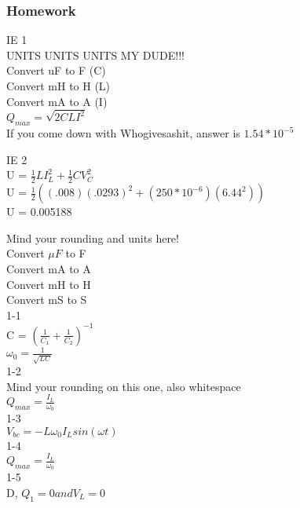 \documentclass{article}
\begin{document}
\subsubsection{Homework}
\noindent
IE 1 \\
UNITS UNITS UNITS MY DUDE!!! \\
Convert uF to F (C)\\
Convert mH to H (L)\\
Convert mA to A (I)\\
$Q_{max} = \sqrt{2 C L I^2}$ \\
If you come down with Whogivesashit, answer is $1.54 * 10^{-5}$

\vspace{2mm}

\noindent
IE 2 \\
U = $\frac{1}{2}LI^2_L + \frac{1}{2}CV^2_C$ \\
U = $\frac{1}{2}((.008)(.0293)^2+(250*10^{-6})(6.44^2))$ \\
U = 0.005188


\vspace{2mm}

\noindent
Mind your rounding and units here! \\
Convert $\mu F$ to F \\
Convert mA to A \\
Convert mH to H \\
Convert mS to S \\
1-1 \\
C = $(\frac{1}{C_1} + \frac{1}{C_2})^{-1}$ \\
$\omega_0 = \frac{1}{\sqrt{LC}}$ \\
1-2 \\
Mind your rounding on this one, also whitespace \\
$Q_{max} = \frac{I_L}{\omega_0}$ \\
1-3 \\
$V_{bc} = -L \omega_0 I_L sin(\omega t)$ \\
1-4 \\
$Q_{max} = \frac{I_L}{\omega_0}$ \\
1-5 \\
D, $Q_1 =0 and V_L = 0$

\vspace{2mm}
\end{document}
